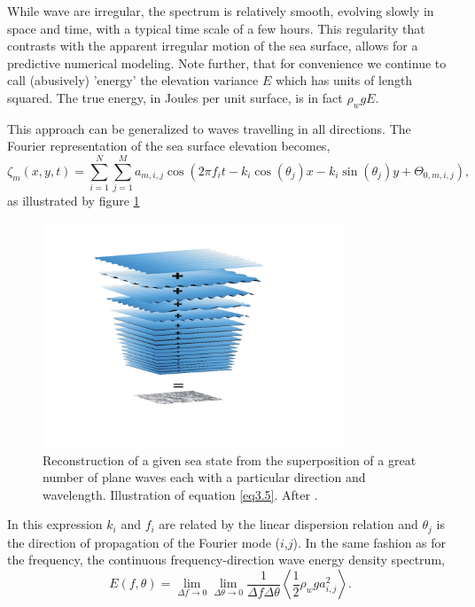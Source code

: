 While wave are irregular, the spectrum is relatively smooth, evolving slowly in space and time, with a typical time scale of a few hours. This regularity 
that contrasts with the apparent irregular motion of the sea surface, allows for a predictive numerical modeling. Note further, that
for convenience we continue to call (abusively) 'energy' the elevation variance $E$ which has units of length squared. 
The true energy, in Joules per unit surface, is in fact $\rho_w g E$. 

 This approach can be generalized to waves travelling in all directions. The Fourier representation of the sea surface elevation becomes,  
\begin{equation}
\zeta_m(x,y,t)=\sum_{i=1}^{N} \sum_{j=1}^{M}a_{m,i,j}\cos(2\pi f_{i}t- k_{i}\cos(\theta_{j}) x - k_{i}\sin(\theta_{j}) y + \Theta_{0,m,i,j}),
\label{eq3.5}
\end{equation}
as illustrated by figure \ref{fig:sumofsinewaves}
\begin{figure}[!htbp]
\centerline{\includegraphics[width=0.8\textwidth]{FIGS_CH_MEASUREMENTS/Pierson1952.jpg}}
\caption{Reconstruction of a given sea state from the superposition of a great number of plane waves each with a particular direction and wavelength. Illustration of equation \ref{eq3.5}. 
After \cite{Pierson&al.1955}.\label{fig:sumofsinewaves}}
\end{figure}

In this expression $k_{i}$ and $f_i$ are related by the linear dispersion relation and $\theta_{j}$ is the direction of
propagation of the Fourier mode ($i$,$j$). In the same fashion as for the frequency, the continuous frequency-direction wave energy
density spectrum, 
\begin{equation}
E(f,\theta)=\lim_{\Delta f\to 0}\lim_{\Delta \theta\to 0}\frac{1}{\Delta f \Delta \theta} \left\langle \frac{1}{2} \rho_w g a_{i,j}^{2}\right\rangle .
\label{eq3.6}
\end{equation}

